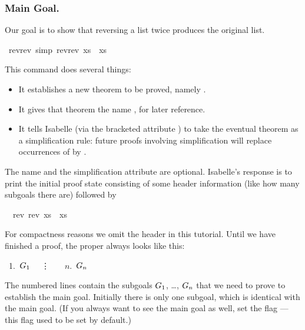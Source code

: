 \begin{isabellebody}
\begin{isamarkuptext}
\subsubsection*{Main Goal.}

Our goal is to show that reversing a list twice produces the original
list.%
\end{isamarkuptext}%
\isamarkuptrue%
\isamarkupfalse%
\ rev{\isacharunderscore}rev\ {\isacharbrackleft}simp{\isacharbrackright}{\isacharcolon}\ {\isachardoublequoteopen}rev{\isacharparenleft}rev\ xs{\isacharparenright}\ {\isacharequal}\ xs{\isachardoublequoteclose}%
\isadelimproof
%
\endisadelimproof
%
\isatagproof
%
\begin{isamarkuptxt}%
%
\noindent
This  command does several things:
\begin{itemize}
\item
It establishes a new theorem to be proved, namely .
\item
It gives that theorem the name , for later reference.
\item
It tells Isabelle (via the bracketed attribute ) to take the eventual theorem as a simplification rule: future proofs involving
simplification will replace occurrences of  by
.
\end{itemize}
The name and the simplification attribute are optional.
Isabelle's response is to print the initial proof state consisting
of some header information (like how many subgoals there are) followed by
\begin{isabelle}%
\ {}{\isachardot}\ rev\ {\isacharparenleft}rev\ xs{\isacharparenright}\ {\isacharequal}\ xs%
\end{isabelle}
For compactness reasons we omit the header in this tutorial.
Until we have finished a proof, the  proper
always looks like this:
\begin{isabelle}
~1.~$G\sb{1}$\isanewline
~~\vdots~~\isanewline
~$n$.~$G\sb{n}$
\end{isabelle}
The numbered lines contain the subgoals $G\sb{1}$, \dots, $G\sb{n}$
that we need to prove to establish the main goal.
Initially there is only one subgoal, which is identical with the
main goal. (If you always want to see the main goal as well,
set the flag 
--- this flag used to be set by default.)


\end{isamarkuptxt}
\end{isabellebody}
